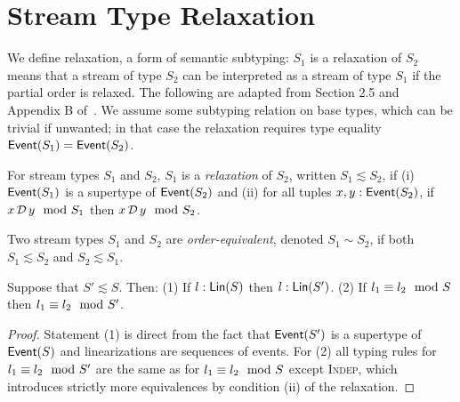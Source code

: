 \section{Stream Type Relaxation}

We define relaxation, a form of semantic subtyping: $S_1$ is a relaxation of $S_2$ means that a stream of type $S_2$ can be interpreted as a stream of type $S_1$ if the partial order is relaxed.
The following are adapted from Section 2.5 and Appendix B of~.
We assume some subtyping relation on base types, which can be trivial if unwanted;
in that case the relaxation requires type equality $\mathsf{Event}(S_1) = \mathsf{Event}(S_2)$.

\begin{definition}
\label{def:stream-relaxation}
For stream types $S_1$ and $S_2$,
$S_1$ is a \emph{relaxation} of $S_2$, written $S_1 \lesssim S_2$, if
(i) $\mathsf{Event}(S_1)$ is a supertype of $\mathsf{Event}(S_2)$
and (ii) for all tuples $x, y: \mathsf{Event}({S_2})$,
if $x \,\mathcal{D}\, y \mod {S_1}$ then $x \,\mathcal{D}\, y \mod {S_2}$.

Two stream types $S_1$ and $S_2$ are \emph{order-equivalent}, denoted $S_1 \sim S_2$, if both $S_1 \lesssim S_2$ and $S_2 \lesssim S_1$.
\end{definition}

\begin{proposition}
\label{prop:stream-relaxation-lin}
\label{45:prop:schema-relaxation-flattening}
Suppose that $S' \lesssim S$. Then:
(1) If $l: \mathsf{Lin}({S})$ then $l: \mathsf{Lin}({S'})$.
(2) If $l_1 \equiv l_2 \mod {S}$ then $l_1 \equiv l_2 \mod {S'}$.
\end{proposition}
\begin{proof}
Statement (1) is direct from the fact that $\mathsf{Event}(S')$ is a supertype of $\mathsf{Event}(S)$
and linearizations are sequences of events.
For (2) all typing rules for $l_1 \equiv l_2 \mod {S'}$ are the same as for $l_1 \equiv l_2 \mod {S}$ except \textsc{Indep}, which introduces strictly more equivalences by condition (ii) of the relaxation.
\end{proof}
%
%

